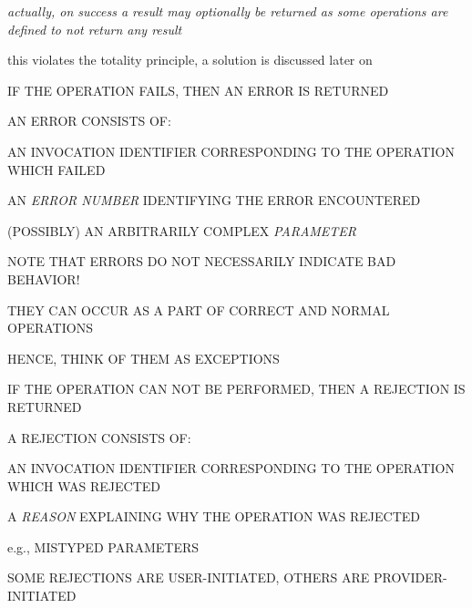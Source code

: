 \begin{note}\em
actually, on success a result \emph{may optionally} be returned as some
operations are defined to not return any result

this violates the totality principle, a solution is discussed later on
\end{note}


\begin{bwslide}

\begin{nrtc}
\item	IF THE OPERATION FAILS, THEN AN ERROR IS RETURNED

\item	AN ERROR CONSISTS OF:
    \begin{nrtc}
    \item	AN INVOCATION IDENTIFIER CORRESPONDING TO THE OPERATION WHICH
		FAILED

    \item	AN \emph{ERROR NUMBER} IDENTIFYING THE ERROR ENCOUNTERED

    \item	(POSSIBLY) AN ARBITRARILY COMPLEX \emph{PARAMETER}
    \end{nrtc}

\item	NOTE THAT ERRORS DO NOT NECESSARILY INDICATE BAD BEHAVIOR!
    \begin{nrtc}
    \item	THEY CAN OCCUR AS A PART OF CORRECT AND NORMAL OPERATIONS

	\item	HENCE, THINK OF THEM AS EXCEPTIONS
    \end{nrtc}
\end{nrtc}
\end{bwslide}


\begin{bwslide}

\begin{nrtc}
\item	IF THE OPERATION CAN NOT BE PERFORMED, THEN A REJECTION IS RETURNED

\item	A REJECTION CONSISTS OF:
    \begin{nrtc}
    \item	AN INVOCATION IDENTIFIER CORRESPONDING TO THE OPERATION WHICH
		WAS REJECTED

    \item	A \emph{REASON} EXPLAINING WHY THE OPERATION WAS REJECTED
	\begin{nrtc}
	\item	e.g., MISTYPED PARAMETERS
	\end{nrtc}
    \end{nrtc}

\item	SOME REJECTIONS ARE USER-INITIATED, OTHERS ARE PROVIDER-INITIATED
\end{nrtc}
\end{bwslide}


